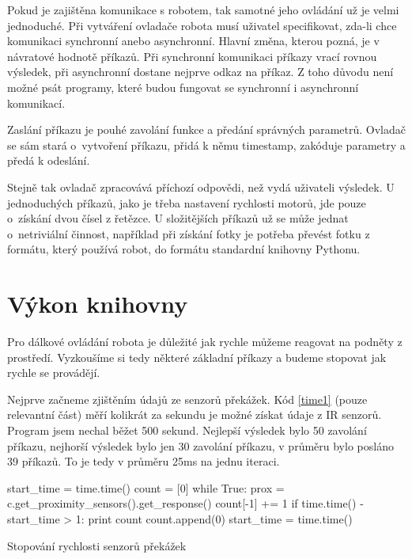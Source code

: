     Pokud je zajištěna komunikace s robotem, tak samotné jeho ovládání už je
    velmi jednoduché. Při vytváření ovladače robota musí uživatel specifikovat,
    zda-li chce komunikaci synchronní anebo asynchronní. Hlavní změna, kterou
    pozná, je v návratové hodnotě příkazů. Při synchronní komunikaci příkazy
    vrací rovnou výsledek, při asynchronní dostane nejprve odkaz na příkaz. Z
    toho důvodu není možné psát programy, které budou fungovat se synchronní i
    asynchronní komunikací.

    Zaslání příkazu je pouhé zavolání funkce a předání správných parametrů.
    Ovladač se sám stará o~vytvoření příkazu, přidá k němu timestamp, zakóduje
    parametry a předá k odeslání.

    Stejně tak ovladač zpracovává příchozí odpovědi, než vydá uživateli
    výsledek. U jednoduchých příkazů, jako je třeba nastavení rychlosti motorů,
    jde pouze o~získání dvou čísel z řetězce. U složitějších příkazů už se může
    jednat o~netriviální činnost, například při získání fotky je potřeba
    převést fotku z formátu, který používá robot, do formátu standardní
    knihovny Pythonu.

    \section{Výkon knihovny}
    \label{benchmark}

    Pro dálkové ovládání robota je důležité jak rychle můžeme reagovat na
    podněty z prostředí. Vyzkoušíme si tedy některé základní příkazy a budeme
    stopovat jak rychle se provádějí.

    Nejprve začneme zjištěním údajů ze senzorů překážek. Kód \ref{time1} (pouze
    relevantní část) měří kolikrát za sekundu je možné získat údaje z IR
    senzorů. Program jsem nechal běžet 500 sekund. Nejlepší výsledek bylo 50
    zavolání příkazu, nejhorší výsledek bylo jen 30 zavolání příkazu, v průměru
    bylo posláno 39 příkazů. To je tedy v průměru 25ms na jednu iteraci.

\begin{listing}
\begin{pyc}
start_time = time.time()
count = [0]
while True:
    prox = c.get_proximity_sensors().get_response()
    count[-1] += 1
    if time.time() - start_time > 1:
        print count
        count.append(0)
        start_time = time.time()
\end{pyc}
\caption{Stopování rychlosti senzorů překážek}
\label{time1}
\end{listing}

